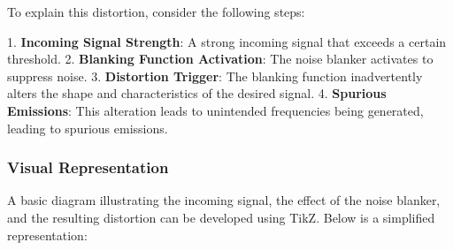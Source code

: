 To explain this distortion, consider the following steps:

1. \textbf{Incoming Signal Strength}: A strong incoming signal that exceeds a certain threshold.
2. \textbf{Blanking Function Activation}: The noise blanker activates to suppress noise.
3. \textbf{Distortion Trigger}: The blanking function inadvertently alters the shape and characteristics of the desired signal.
4. \textbf{Spurious Emissions}: This alteration leads to unintended frequencies being generated, leading to spurious emissions.

\subsubsection{Visual Representation}

A basic diagram illustrating the incoming signal, the effect of the noise blanker, and the resulting distortion can be developed using TikZ. Below is a simplified representation:

\begin{tcolorbox}
\begin{center}
\end{center}
\end{tcolorbox}
